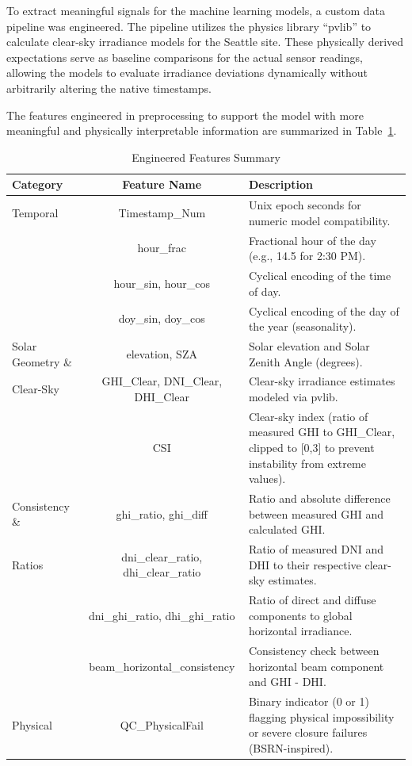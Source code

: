 \documentclass[12pt]{article}
\begin{document}
To extract meaningful signals for the machine learning models, a custom data pipeline was engineered. The pipeline utilizes the physics library ``pvlib'' \cite{anderson2023pvlib} to calculate clear-sky irradiance models for the Seattle site. These physically derived expectations serve as baseline comparisons for the actual sensor readings, allowing the models to evaluate irradiance deviations dynamically without arbitrarily altering the native timestamps. 

The features engineered in preprocessing to support the model with more meaningful and physically interpretable information are summarized in Table~\ref{tab:engineered_features}.

\begin{table}[H]
    \centering
    \caption{Engineered Features Summary}\label{tab:engineered_features}
    \begin{tabular}{lcp{9cm}}
        \toprule
        Category & Feature Name & Description \\
        \midrule
        Temporal & Timestamp\_Num & Unix epoch seconds for numeric model compatibility. \\
        & hour\_frac & Fractional hour of the day (e.g., 14.5 for 2:30 PM). \\
        & hour\_sin, hour\_cos & Cyclical encoding of the time of day. \\
        & doy\_sin, doy\_cos & Cyclical encoding of the day of the year (seasonality). \\
        \midrule
        Solar Geometry \& & elevation, SZA & Solar elevation and Solar Zenith Angle (degrees). \\
        Clear-Sky & GHI\_Clear, DNI\_Clear, DHI\_Clear & Clear-sky irradiance estimates modeled via pvlib. \\
        & CSI & Clear-sky index (ratio of measured GHI to GHI\_Clear, clipped to [0,3] to prevent instability from extreme values). \\
        \midrule
        Consistency \& & ghi\_ratio, ghi\_diff & Ratio and absolute difference between measured GHI and calculated GHI. \\
        Ratios & dni\_clear\_ratio, dhi\_clear\_ratio & Ratio of measured DNI and DHI to their respective clear-sky estimates. \\
        & dni\_ghi\_ratio, dhi\_ghi\_ratio & Ratio of direct and diffuse components to global horizontal irradiance. \\
        & beam\_horizontal\_consistency & Consistency check between horizontal beam component and GHI - DHI. \\
        \midrule
        Physical & QC\_PhysicalFail & Binary indicator (0 or 1) flagging physical impossibility or severe closure failures (BSRN-inspired). \\
        \bottomrule
    \end{tabular}
\end{table}
\end{document}
